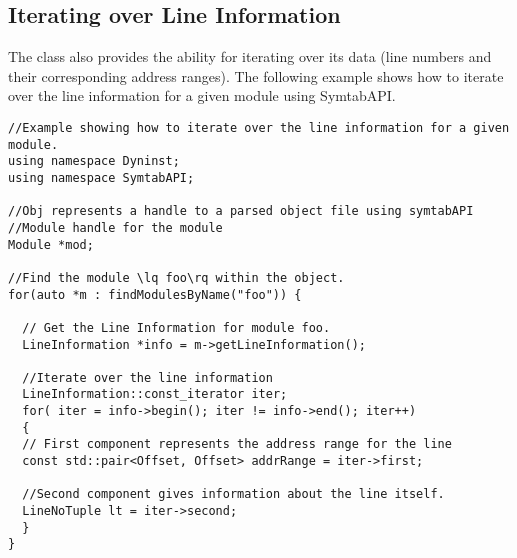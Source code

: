 \subsection{Iterating over Line Information}\label{subsec:LineNoIterating}
The  class also provides the ability for iterating over its data (line numbers and their corresponding address ranges). The following example shows how to iterate over the line information for a given module using SymtabAPI.

\begin{lstlisting}
//Example showing how to iterate over the line information for a given module.
using namespace Dyninst;
using namespace SymtabAPI;

//Obj represents a handle to a parsed object file using symtabAPI
//Module handle for the module
Module *mod;

//Find the module \lq foo\rq within the object.
for(auto *m : findModulesByName("foo")) {

  // Get the Line Information for module foo.
  LineInformation *info = m->getLineInformation();
  
  //Iterate over the line information
  LineInformation::const_iterator iter;
  for( iter = info->begin(); iter != info->end(); iter++)
  {
  // First component represents the address range for the line
  const std::pair<Offset, Offset> addrRange = iter->first;
  
  //Second component gives information about the line itself.
  LineNoTuple lt = iter->second;
  }
}
\end{lstlisting}
